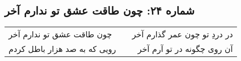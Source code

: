 \begin{center}
\section*{شماره ۲۴: چون طاقت عشق تو ندارم آخر}
\label{sec:024}
\begin{longtable}{l p{0.5cm} r}
چون طاقت عشق تو ندارم آخر
&&
در دردِ تو چون عمر گذارم آخر
\\
رویی که به صد هزار باطل کردم
&&
آن روی چگونه در تو آرم آخر
\\
\end{longtable}
\end{center}
